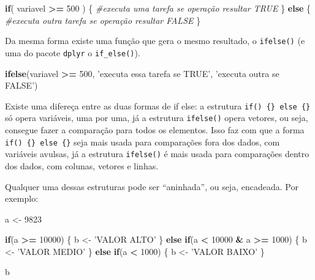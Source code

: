 \documentclass[]{book}
\newenvironment{Shaded}{\begin{snugshade}}{\end{snugshade}}
\newcommand{\KeywordTok}[1]{\textcolor[rgb]{0.13,0.29,0.53}{\textbf{#1}}}
\newcommand{\DecValTok}[1]{\textcolor[rgb]{0.00,0.00,0.81}{#1}}
\newcommand{\StringTok}[1]{\textcolor[rgb]{0.31,0.60,0.02}{#1}}
\newcommand{\CommentTok}[1]{\textcolor[rgb]{0.56,0.35,0.01}{\textit{#1}}}
\newcommand{\ControlFlowTok}[1]{\textcolor[rgb]{0.13,0.29,0.53}{\textbf{#1}}}
\newcommand{\OperatorTok}[1]{\textcolor[rgb]{0.81,0.36,0.00}{\textbf{#1}}}
\newcommand{\NormalTok}[1]{#1}
\begin{document}
\begin{Shaded}
\begin{Highlighting}[]
\ControlFlowTok{if}\NormalTok{( variavel }\OperatorTok{>=}\StringTok{ }\DecValTok{500}\NormalTok{ ) \{}
  \CommentTok{#executa uma tarefa se operação resultar TRUE}
\NormalTok{\} }\ControlFlowTok{else}\NormalTok{ \{}
  \CommentTok{#executa outra tarefa se operação resultar FALSE}
\NormalTok{\}}
\end{Highlighting}
\end{Shaded}

Da mesma forma existe uma função que gera o mesmo resultado, o
\texttt{ifelse()} (e uma do pacote \texttt{dplyr} o
\texttt{if\_else()}).

\begin{Shaded}
\begin{Highlighting}[]
\KeywordTok{ifelse}\NormalTok{(variavel }\OperatorTok{>=}\StringTok{ }\DecValTok{500}\NormalTok{, }\StringTok{'executa essa tarefa se TRUE'}\NormalTok{, }\StringTok{'executa outra se FALSE'}\NormalTok{)}
\end{Highlighting}
\end{Shaded}

Existe uma difereça entre as duas formas de if else: a estrutura
\texttt{if()\ \{\}\ else\ \{\}} só opera variáveis, uma por uma, já a
estrutura \texttt{ifelse()} opera vetores, ou seja, consegue fazer a
comparação para todos os elementos. Isso faz com que a forma
\texttt{if()\ \{\}\ else\ \{\}} seja mais usada para comparações fora
dos dados, com variáveis avulsas, já a estrutura \texttt{ifelse()} é
mais usada para comparações dentro dos dados, com colunas, vetores e
linhas.

Qualquer uma dessas estruturas pode ser ``aninhada'', ou seja,
encadeada. Por exemplo:

\begin{Shaded}
\begin{Highlighting}[]
\NormalTok{a <-}\StringTok{ }\DecValTok{9823}

\ControlFlowTok{if}\NormalTok{(a }\OperatorTok{>=}\StringTok{ }\DecValTok{10000}\NormalTok{) \{}
\NormalTok{  b <-}\StringTok{ 'VALOR ALTO'}
\NormalTok{\} }\ControlFlowTok{else} \ControlFlowTok{if}\NormalTok{(a }\OperatorTok{<}\StringTok{ }\DecValTok{10000} \OperatorTok{&}\StringTok{ }\NormalTok{a }\OperatorTok{>=}\StringTok{ }\DecValTok{1000}\NormalTok{) \{}
\NormalTok{  b <-}\StringTok{ 'VALOR MEDIO'} 
\NormalTok{\} }\ControlFlowTok{else} \ControlFlowTok{if}\NormalTok{(a }\OperatorTok{<}\StringTok{ }\DecValTok{1000}\NormalTok{) \{}
\NormalTok{  b <-}\StringTok{ 'VALOR BAIXO'}
\NormalTok{\}}

\NormalTok{b}
\end{Highlighting}
\end{Shaded}
\end{document}
